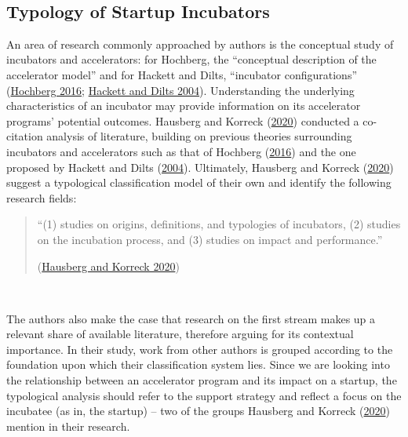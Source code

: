\documentclass[
  12pt,
]{article}
\begin{document}
~

\hypertarget{typology-of-startup-incubators}{%
\subsection{Typology of Startup Incubators}\label{typology-of-startup-incubators}}

An area of research commonly approached by authors is the conceptual study of incubators and accelerators: for Hochberg, the ``conceptual description of the accelerator model'' and for Hackett and Dilts, ``incubator configurations'' (\protect\hyperlink{ref-hochberg_accelerating_2016}{Hochberg 2016}; \protect\hyperlink{ref-hackett_systematic_2004}{Hackett and Dilts 2004}). Understanding the underlying characteristics of an incubator may provide information on its accelerator programs' potential outcomes. Hausberg and Korreck (\protect\hyperlink{ref-hausberg_business_2020}{2020}) conducted a co-citation analysis of literature, building on previous theories surrounding incubators and accelerators such as that of Hochberg (\protect\hyperlink{ref-hochberg_accelerating_2016}{2016}) and the one proposed by Hackett and Dilts (\protect\hyperlink{ref-hackett_systematic_2004}{2004}). Ultimately, Hausberg and Korreck (\protect\hyperlink{ref-hausberg_business_2020}{2020}) suggest a typological classification model of their own and identify the following research fields:

\begin{quote}
``(1) studies on origins, definitions, and typologies of incubators, (2) studies on the incubation process, and (3) studies on impact and performance.''

(\protect\hyperlink{ref-hausberg_business_2020}{Hausberg and Korreck 2020})
\end{quote}

~

The authors also make the case that research on the first stream makes up a relevant share of available literature, therefore arguing for its contextual importance. In their study, work from other authors is grouped according to the foundation upon which their classification system lies. Since we are looking into the relationship between an accelerator program and its impact on a startup, the typological analysis should refer to the support strategy and reflect a focus on the incubatee (as in, the startup) -- two of the groups Hausberg and Korreck (\protect\hyperlink{ref-hausberg_business_2020}{2020}) mention in their research.
\end{document}

